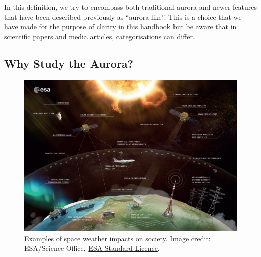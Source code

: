 \documentclass{article}
\begin{document}
In this definition, we try to encompass both traditional aurora and newer features that have been described previously as ``aurora-like''. This is a choice that we have made for the purpose of clarity in this handbook but be aware that in scientific papers and media articles, categorisations can differ.




\subsection{Why Study the Aurora?}

\begin{figure}[h!]
  \includegraphics[width=\linewidth]{Fig2_SpaceWeather.jpg}
  \caption{Examples of space weather impacts on society. Image credit: ESA/Science Office, \href{https://www.esa.int/ESA_Multimedia/Terms_and_conditions_of_use_of_images_and_videos_available_on_the_esa_website}{ESA Standard Licence}.}
  \label{fig-space-weather}
  
\end{figure}
\end{document}
